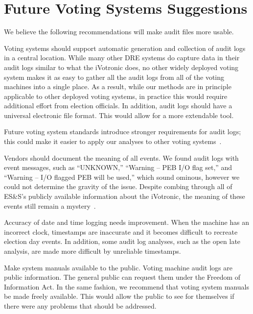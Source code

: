 \documentclass[letterpaper,twocolumn,10pt]{article}
\begin{document}
\section{Future Voting Systems Suggestions}
\label{sec:suggestions}
We believe the following recommendations will make audit files more usable. 

Voting systems should support automatic generation and collection of audit logs 
in a central location.  While many other DRE systems do capture data in their audit logs similar to what
the iVotronic does, no other widely deployed voting system makes it as easy to
gather all the audit logs from all of the voting machines into a single
place. As a result, while our methods are in principle applicable to other
deployed voting systems, in practice this would require additional effort from
election officials. 
 In addition, audit logs should have a universal 
electronic file format.  This would allow for a more extendable tool.

Future voting system standards introduce stronger
requirements for audit logs; this could make it easier to apply our analyses to
other voting systems~\cite{Wagner2010}.  

Vendors should document the meaning of all events. We found audit logs with
event messages, such as ``UNKNOWN,'' ``Warning – PEB I/O flag set,'' and
``Warning – I/O flagged PEB will be used,'' which sound ominous, however we
could not determine the gravity of the issue. Despite combing through all of
ES\&S’s publicly available information about the iVotronic, the meaning of these
events still remain a mystery~\cite{VerVot2011, ESS2011a, ESS2011b}. 
 
Accuracy of date and time logging needs improvement. When the machine has an
incorrect clock, timestamps are inaccurate and it becomes difficult to recreate
election day events. In addition, some audit log analyses, such as the open late
analysis, are made more difficult by unreliable timestamps. 
 
Make system manuals available to the public. Voting machine audit logs are
public information. The general public can request them under the Freedom of
Information Act. In the same fashion, we recommend that voting system manuals be
made freely available. This would allow the public to see for themselves if
there were any problems that should be addressed.  
 
\end{document}
